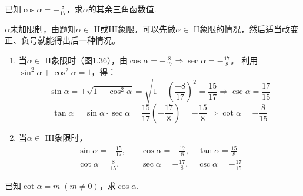 \begin{example}
已知$\cos\alpha=-\frac{8}{17}$，求$\alpha$的其余三角函数值.
\end{example}

\begin{analyze}
$\alpha$未加限制，由题知$\alpha\in$ II或III象限。可以先做$\alpha\in$ II象限的情况，然后适当改变正、负号就能得出后一种情况。
\end{analyze}

\begin{solution}
\begin{enumerate}[(1)]
    \item 当$\alpha\in$ II象限时（图1.36），由$\cos\alpha=-\frac{8}{17}\Rightarrow\sec\alpha=-\frac{17}{8}$。
利用$\sin^2\alpha+\cos^2\alpha=1$，得：
\[\sin\alpha=+\sqrt{1-\cos^2\alpha}=\sqrt{1-\left(\frac{-8}{17}\right)^2}=\frac{15}{17}\Rightarrow \csc\alpha=\frac{17}{15}\]
\[\tan\alpha=\sin\alpha\cdot \sec\alpha=\frac{15}{17}\left(-\frac{17}{8}\right)=-\frac{15}{8}\Rightarrow\cot\alpha=-\frac{8}{15}\]

\item 当$\alpha\in$ III象限时，
\[\begin{split}
    \sin\alpha=-\frac{15}{17},&\quad \cos\alpha=-\frac{17}{8},\quad \tan\alpha=\frac{15}{8}\\
    \cot\alpha=\frac{8}{15},&\quad \sec\alpha=-\frac{17}{8},\quad \csc\alpha=-\frac{17}{15}
\end{split} \]
\end{enumerate}
    
\end{solution}

\begin{example}
已知$\cot\alpha=m\; (m\ne 0)$，求$\cos\alpha$.
\end{example}

\begin{figure}[htp]
    \centering
{}
    \caption{}
\end{figure}

